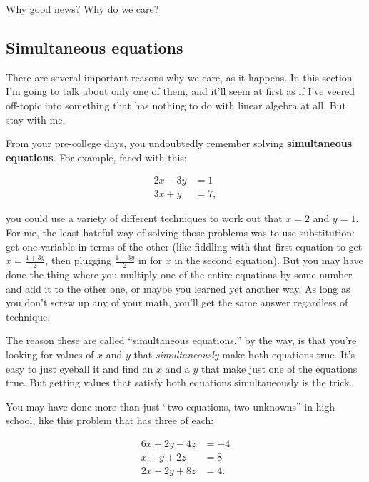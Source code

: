 Why good news? Why do we care?

\subsection{Simultaneous equations}

There are several important reasons why we care, as it happens. In this section
I'm going to talk about only one of them, and it'll seem at first as if I've
veered off-topic into something that has nothing to do with linear algebra at
all. But stay with me.


From your pre-college days, you undoubtedly remember solving
\textbf{simultaneous equations}. For example, faced with this:

\vspace{-.25in}
\begin{align*}
2x - 3y &= 1 \\
3x + y &= 7,
\end{align*}
\vspace{-.25in}

\label{hellaciousAlgebra}

you could use a variety of different techniques to work out that $x=2$ and
$y=1$. For me, the least hateful way of solving those problems was to use
substitution: get one variable in terms of the other (like fiddling with that
first equation to get $x = \frac{1+3y}{2}$, then plugging $\frac{1+3y}{2}$ in
for $x$ in the second equation). But you may have done the thing where you
multiply one of the entire equations by some number and add it to the other
one, or maybe you learned yet another way. As long as you don't screw up any of
your math, you'll get the same answer regardless of technique.

The reason these are called ``simultaneous equations,'' by the way, is that
you're looking for values of $x$ and $y$ that \textit{simultaneously} make both
equations true. It's easy to just eyeball it and find an $x$ and a $y$ that
make just one of the equations true. But getting values that satisfy both
equations simultaneously is the trick.

\smallskip

You may have done more than just ``two equations, two unknowns'' in high
school, like this problem that has three of each:

\label{threeEqsThreeUnknowns}
\vspace{-.25in}
\begin{align*}
6x + 2y - 4z &= -4 \\
x + y + 2z &= 8 \\
2x - 2y + 8z &= 4.
\end{align*}
\vspace{-.25in}

